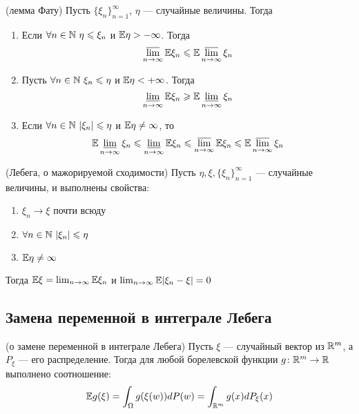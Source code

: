 \begin{theorem} (лемма Фату)
	Пусть $\{\xi_n\}_{n = 1}^\infty$, $\eta$ --- случайные величины. Тогда
	\begin{enumerate}
		\item Если $\forall n \in \mathbb{N}\ \eta \leqslant \xi_n$ и $\mathbb{E}\eta > -\infty$. Тогда
		\[
		\varlimsup_{n \to \infty} \mathbb{E}\xi_n \leqslant \mathbb{E} \varlimsup_{n \to \infty} \xi_n
		\]
		
		\item Пусть $\forall n \in \mathbb{N}\ \xi_n \leqslant \eta$ и $\mathbb{E}\eta < +\infty$. Тогда
		\[
		\varliminf_{n \to \infty} \mathbb{E}\xi_n \geqslant \mathbb{E} \varliminf_{n \to \infty} \xi_n
		\]
		
		\item Если $\forall n \in \mathbb{N}\ |\xi_n| \leqslant \eta$ и $\mathbb{E}\eta \neq \infty$, то
		\[
		\mathbb{E} \varliminf_{n \to \infty} \xi_n \leqslant \varliminf_{n \to \infty} \mathbb{E}\xi_n \leqslant \varlimsup_{n \to \infty} \mathbb{E}\xi_n \leqslant \mathbb{E} \varlimsup_{n \to \infty} \xi_n
		\]
	\end{enumerate}
\end{theorem}

\begin{theorem} (Лебега, о мажорируемой сходимости)
	Пусть $\eta, \xi, \{\xi_n\}_{n = 1}^\infty$ --- случайные величины, и выполнены свойства:
	\begin{enumerate}
		\item $\xi_n \to \xi$ почти всюду
		
		\item $\forall n \in \mathbb{N}\ |\xi_n| \leqslant \eta$
		
		\item $\mathbb{E}\eta \neq \infty$
	\end{enumerate}
	Тогда $\mathbb{E}\xi = \lim_{n \to \infty} \mathbb{E}\xi_n$ и $\lim_{n \to \infty} \mathbb{E} |\xi_n - \xi| = 0$
\end{theorem}

\subsection{Замена переменной в интеграле Лебега}

\begin{theorem} (о замене переменной в интеграле Лебега)
	Пусть $\xi$ --- случайный вектор из $\mathbb{R}^m$, а $P_\xi$ --- его распределение. Тогда для любой борелевской функции $g \colon \mathbb{R}^m \to \mathbb{R}$ выполнено соотношение:
	\[
		\mathbb{E} g(\xi) = \int_\Omega g(\xi(w))dP(w) = \int_{\mathbb{R}^m} g(x) dP_\xi(x)
 	\]
\end{theorem}

